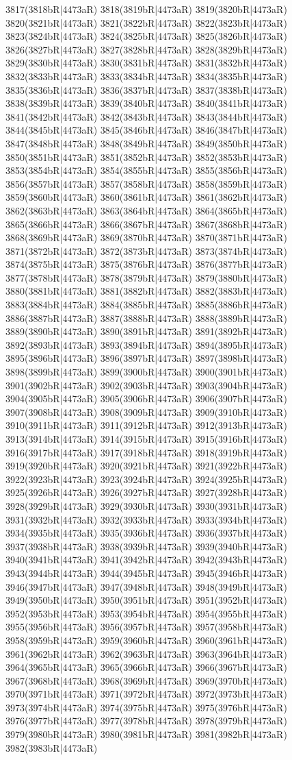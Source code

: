3817(3818bR|4473aR) 3818(3819bR|4473aR) 3819(3820bR|4473aR) 3820(3821bR|4473aR) 3821(3822bR|4473aR) 3822(3823bR|4473aR) 3823(3824bR|4473aR) 3824(3825bR|4473aR) 3825(3826bR|4473aR) 3826(3827bR|4473aR) 3827(3828bR|4473aR) 3828(3829bR|4473aR) 3829(3830bR|4473aR) 3830(3831bR|4473aR) 3831(3832bR|4473aR) 3832(3833bR|4473aR) 3833(3834bR|4473aR) 3834(3835bR|4473aR) 3835(3836bR|4473aR) 3836(3837bR|4473aR) 3837(3838bR|4473aR) 3838(3839bR|4473aR) 3839(3840bR|4473aR) 3840(3841bR|4473aR) 3841(3842bR|4473aR) 3842(3843bR|4473aR) 3843(3844bR|4473aR) 3844(3845bR|4473aR) 3845(3846bR|4473aR) 3846(3847bR|4473aR) 3847(3848bR|4473aR) 3848(3849bR|4473aR) 3849(3850bR|4473aR) 3850(3851bR|4473aR) 3851(3852bR|4473aR) 3852(3853bR|4473aR) 3853(3854bR|4473aR) 3854(3855bR|4473aR) 3855(3856bR|4473aR) 3856(3857bR|4473aR) 3857(3858bR|4473aR) 3858(3859bR|4473aR) 3859(3860bR|4473aR) 3860(3861bR|4473aR) 3861(3862bR|4473aR) 3862(3863bR|4473aR) 3863(3864bR|4473aR) 3864(3865bR|4473aR) 3865(3866bR|4473aR) 3866(3867bR|4473aR) 3867(3868bR|4473aR) 3868(3869bR|4473aR) 3869(3870bR|4473aR) 3870(3871bR|4473aR) 3871(3872bR|4473aR) 3872(3873bR|4473aR) 3873(3874bR|4473aR) 3874(3875bR|4473aR) 3875(3876bR|4473aR) 3876(3877bR|4473aR) 3877(3878bR|4473aR) 3878(3879bR|4473aR) 3879(3880bR|4473aR) 3880(3881bR|4473aR) 3881(3882bR|4473aR) 3882(3883bR|4473aR) 3883(3884bR|4473aR) 3884(3885bR|4473aR) 3885(3886bR|4473aR) 3886(3887bR|4473aR) 3887(3888bR|4473aR) 3888(3889bR|4473aR) 3889(3890bR|4473aR) 3890(3891bR|4473aR) 3891(3892bR|4473aR) 3892(3893bR|4473aR) 3893(3894bR|4473aR) 3894(3895bR|4473aR) 3895(3896bR|4473aR) 3896(3897bR|4473aR) 3897(3898bR|4473aR) 3898(3899bR|4473aR) 3899(3900bR|4473aR) 3900(3901bR|4473aR) 3901(3902bR|4473aR) 3902(3903bR|4473aR) 3903(3904bR|4473aR) 3904(3905bR|4473aR) 3905(3906bR|4473aR) 3906(3907bR|4473aR) 3907(3908bR|4473aR) 3908(3909bR|4473aR) 3909(3910bR|4473aR) 3910(3911bR|4473aR) 3911(3912bR|4473aR) 3912(3913bR|4473aR) 3913(3914bR|4473aR) 3914(3915bR|4473aR) 3915(3916bR|4473aR) 3916(3917bR|4473aR) 3917(3918bR|4473aR) 3918(3919bR|4473aR) 3919(3920bR|4473aR) 3920(3921bR|4473aR) 3921(3922bR|4473aR) 3922(3923bR|4473aR) 3923(3924bR|4473aR) 3924(3925bR|4473aR) 3925(3926bR|4473aR) 3926(3927bR|4473aR) 3927(3928bR|4473aR) 3928(3929bR|4473aR) 3929(3930bR|4473aR) 3930(3931bR|4473aR) 3931(3932bR|4473aR) 3932(3933bR|4473aR) 3933(3934bR|4473aR) 3934(3935bR|4473aR) 3935(3936bR|4473aR) 3936(3937bR|4473aR) 3937(3938bR|4473aR) 3938(3939bR|4473aR) 3939(3940bR|4473aR) 3940(3941bR|4473aR) 3941(3942bR|4473aR) 3942(3943bR|4473aR) 3943(3944bR|4473aR) 3944(3945bR|4473aR) 3945(3946bR|4473aR) 3946(3947bR|4473aR) 3947(3948bR|4473aR) 3948(3949bR|4473aR) 3949(3950bR|4473aR) 3950(3951bR|4473aR) 3951(3952bR|4473aR) 3952(3953bR|4473aR) 3953(3954bR|4473aR) 3954(3955bR|4473aR) 3955(3956bR|4473aR) 3956(3957bR|4473aR) 3957(3958bR|4473aR) 3958(3959bR|4473aR) 3959(3960bR|4473aR) 3960(3961bR|4473aR) 3961(3962bR|4473aR) 3962(3963bR|4473aR) 3963(3964bR|4473aR) 3964(3965bR|4473aR) 3965(3966bR|4473aR) 3966(3967bR|4473aR) 3967(3968bR|4473aR) 3968(3969bR|4473aR) 3969(3970bR|4473aR) 3970(3971bR|4473aR) 3971(3972bR|4473aR) 3972(3973bR|4473aR) 3973(3974bR|4473aR) 3974(3975bR|4473aR) 3975(3976bR|4473aR) 3976(3977bR|4473aR) 3977(3978bR|4473aR) 3978(3979bR|4473aR) 3979(3980bR|4473aR) 3980(3981bR|4473aR) 3981(3982bR|4473aR) 3982(3983bR|4473aR) 